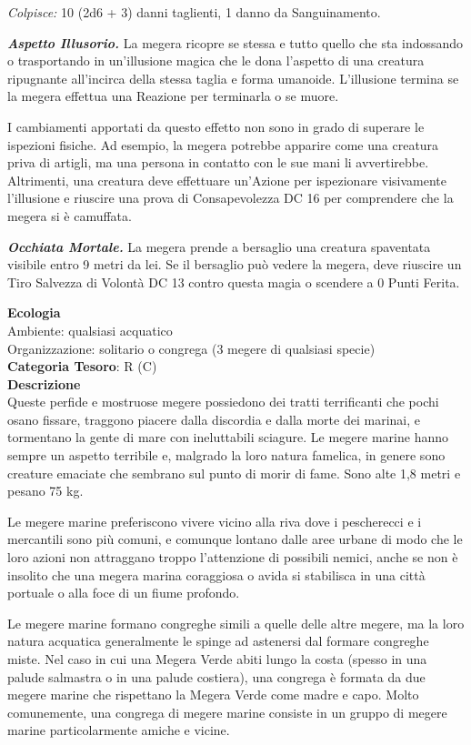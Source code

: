 \begin{multicols}{2}
{\emph{Colpisce:} 10 (2d6 + 3) danni taglienti, 1 danno da Sanguinamento.

\emph{\textbf{Aspetto Illusorio.}} La megera ricopre se stessa e tutto quello che sta indossando o trasportando in un'illusione magica che le dona l'aspetto di una creatura ripugnante all'incirca della stessa taglia e forma umanoide. L'illusione termina se la megera effettua una Reazione per terminarla o se muore.

I cambiamenti apportati da questo effetto non sono in grado di superare le ispezioni fisiche. Ad esempio, la megera potrebbe apparire come una creatura priva di artigli, ma una persona in contatto con le sue mani li avvertirebbe. Altrimenti, una creatura deve effettuare un'Azione per ispezionare visivamente l'illusione e riuscire una prova di Consapevolezza DC 16 per comprendere che la megera si è camuffata.

\emph{\textbf{Occhiata Mortale.}} La megera prende a bersaglio una creatura spaventata visibile entro 9 metri da lei. Se il bersaglio può vedere la megera, deve riuscire un Tiro Salvezza di Volontà DC 13 contro questa magia o scendere a 0 Punti Ferita.

\textbf{Ecologia}\\
Ambiente: qualsiasi acquatico\\
Organizzazione: solitario o congrega (3 megere di qualsiasi specie)\\
\textbf{Categoria Tesoro}: R (C)\\
\textbf{Descrizione}\\
Queste perfide e mostruose megere possiedono dei tratti terrificanti che pochi osano fissare, traggono piacere dalla discordia e dalla morte dei marinai, e tormentano la gente di mare con ineluttabili sciagure. Le megere marine hanno sempre un aspetto terribile e, malgrado la loro natura famelica, in genere sono creature emaciate che sembrano sul punto di morir di fame. Sono alte 1,8 metri e pesano 75 kg.

Le megere marine preferiscono vivere vicino alla riva dove i pescherecci e i mercantili sono più comuni, e comunque lontano dalle aree urbane di modo che le loro azioni non attraggano troppo l'attenzione di possibili nemici, anche se non è insolito che una megera marina coraggiosa o avida si stabilisca in una città portuale o alla foce di un fiume profondo.

Le megere marine formano congreghe simili a quelle delle altre megere, ma la loro natura acquatica generalmente le spinge ad astenersi dal formare congreghe miste. Nel caso in cui una Megera Verde abiti lungo la costa (spesso in una palude salmastra o in una palude costiera), una congrega è formata da due megere marine che rispettano la Megera Verde come madre e capo. Molto comunemente, una congrega di megere marine consiste in un gruppo di megere marine particolarmente amiche e vicine.

}
\end{multicols}
